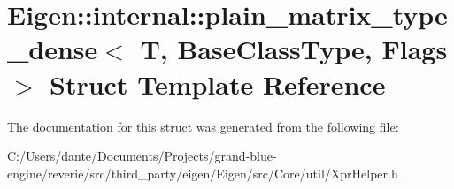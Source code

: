 \hypertarget{struct_eigen_1_1internal_1_1plain__matrix__type__dense}{}\section{Eigen\+::internal\+::plain\+\_\+matrix\+\_\+type\+\_\+dense$<$ T, Base\+Class\+Type, Flags $>$ Struct Template Reference}
\label{struct_eigen_1_1internal_1_1plain__matrix__type__dense}


The documentation for this struct was generated from the following file\+:\begin{DoxyCompactItemize}
\item 
C\+:/\+Users/dante/\+Documents/\+Projects/grand-\/blue-\/engine/reverie/src/third\+\_\+party/eigen/\+Eigen/src/\+Core/util/Xpr\+Helper.\+h\end{DoxyCompactItemize}
